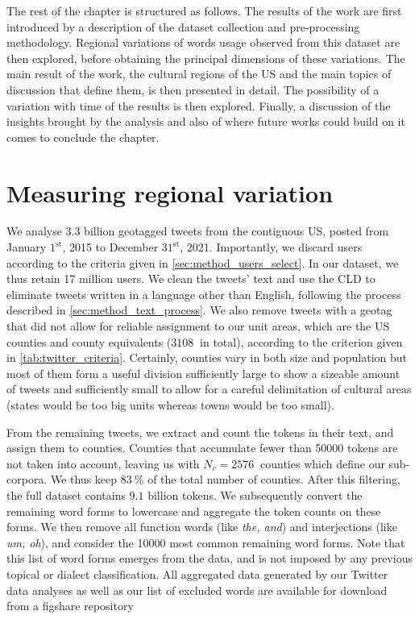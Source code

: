 \documentclass[../thesis.tex]{subfiles}
\begin{document}
The rest of the chapter is structured as follows.
The results of the work are first
introduced by a description of the dataset collection and pre-processing methodology.
Regional variations of words usage observed from this dataset are then explored, before
obtaining the principal dimensions of these variations. The main result of the work, the
cultural regions of the US and the main topics of discussion that define them, is then
presented in detail. The possibility of a variation with time of the results is then
explored. Finally, a discussion of the insights brought by the analysis and also of
where future works could build on it comes to conclude the chapter.


\section{Measuring regional variation}
We analyse 3.3 billion geotagged tweets from the contiguous US, posted from January
$1^\text{st}$, 2015 to December $31^\text{st}$, 2021. Importantly, we discard users
according to the criteria given in \cref{sec:method_users_select}. In our dataset, we
thus retain 17 million users. We clean the tweets' text and use the \ac{CLD} to
eliminate tweets written in a language other than English, following the process
described in \cref{sec:method_text_process}. We also remove tweets with a geotag that
did not allow for reliable assignment to our unit areas, which are the US counties and
county equivalents ($\SI{3108}{}$ in total), according to the criterion given in
\cref{tab:twitter_criteria}. Certainly, counties vary in both size and population but
most of them form a useful division sufficiently large to show a sizeable amount of
tweets and sufficiently small to allow for a careful delimitation of cultural areas
(states would be too big units whereas towns would be too small).

From the remaining tweets, we extract and count the tokens in their text, and assign
them to counties. Counties that accumulate fewer than \SI{50000}{} tokens are not taken
into account, leaving us with $N_c = \SI{2576}{}$ counties which define our sub-corpora.
We thus keep $\SI{83}{\percent}$ of the total number of counties. After this filtering,
the full dataset contains $9.1$ billion tokens. We subsequently convert the remaining
word forms to lowercase and aggregate the token counts on these forms. We then remove
all function words (like \textit{the, and}) and interjections (like \textit{um, oh}), and consider the
\SI{10000}{} most common remaining word forms. Note that this list of word forms emerges
from the data, and is not imposed by any previous topical or dialect classification.
All aggregated data generated by our Twitter data analyses as well as our list of
excluded words are available for download from a figshare repository
\cite{LoufWordCounts2023}
\end{document}
